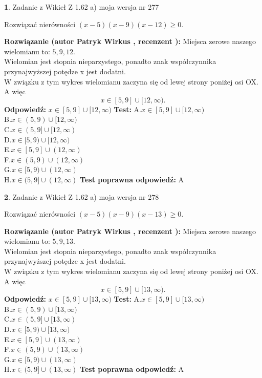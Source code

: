 \documentclass[12pt, a4paper]{article}
\theoremstyle{definition} %
\newtheorem{zad}{}
\newcommand{\zadStart}[1]{\begin{zad}#1\newline}
\newcommand{\zadStop}{\end{zad}}
\newcommand{\rozwStart}[2]{\noindent \textbf{Rozwiązanie (autor #1 , recenzent #2): }\newline}
\newcommand{\rozwStop}{\newline}
\newcommand{\odpStart}{\noindent \textbf{Odpowiedź:}\newline}
\newcommand{\odpStop}{\newline}
\newcommand{\testStart}{\noindent \textbf{Test:}\newline}
\newcommand{\testStop}{\newline}
\newcommand{\kluczStart}{\noindent \textbf{Test poprawna odpowiedź:}\newline}
\newcommand{\kluczStop}{\newline}
\begin{document}
\zadStart{Zadanie z Wikieł Z 1.62 a) moja wersja nr 277}

Rozwiązać nierówności $(x-5)(x-9)(x-12)\ge0$.
\zadStop
\rozwStart{Patryk Wirkus}{}
Miejsca zerowe naszego wielomianu to: $5, 9, 12$.\\
Wielomian jest stopnia nieparzystego, ponadto znak współczynnika przy\linebreak najwyższej potędze x jest dodatni.\\ W związku z tym wykres wielomianu zaczyna się od lewej strony poniżej osi OX. A więc $$x \in [5,9] \cup [12,\infty).$$
\rozwStop
\odpStart
$x \in [5,9] \cup [12,\infty)$
\odpStop
\testStart
A.$x \in [5,9] \cup [12,\infty)$\\
B.$x \in (5,9) \cup [12,\infty)$\\
C.$x \in (5,9] \cup [12,\infty)$\\
D.$x \in [5,9) \cup [12,\infty)$\\
E.$x \in [5,9] \cup (12,\infty)$\\
F.$x \in (5,9) \cup (12,\infty)$\\
G.$x \in [5,9) \cup (12,\infty)$\\
H.$x \in (5,9] \cup (12,\infty)$
\testStop
\kluczStart
A
\kluczStop



\zadStart{Zadanie z Wikieł Z 1.62 a) moja wersja nr 278}

Rozwiązać nierówności $(x-5)(x-9)(x-13)\ge0$.
\zadStop
\rozwStart{Patryk Wirkus}{}
Miejsca zerowe naszego wielomianu to: $5, 9, 13$.\\
Wielomian jest stopnia nieparzystego, ponadto znak współczynnika przy\linebreak najwyższej potędze x jest dodatni.\\ W związku z tym wykres wielomianu zaczyna się od lewej strony poniżej osi OX. A więc $$x \in [5,9] \cup [13,\infty).$$
\rozwStop
\odpStart
$x \in [5,9] \cup [13,\infty)$
\odpStop
\testStart
A.$x \in [5,9] \cup [13,\infty)$\\
B.$x \in (5,9) \cup [13,\infty)$\\
C.$x \in (5,9] \cup [13,\infty)$\\
D.$x \in [5,9) \cup [13,\infty)$\\
E.$x \in [5,9] \cup (13,\infty)$\\
F.$x \in (5,9) \cup (13,\infty)$\\
G.$x \in [5,9) \cup (13,\infty)$\\
H.$x \in (5,9] \cup (13,\infty)$
\testStop
\kluczStart
A
\kluczStop
\end{document}
